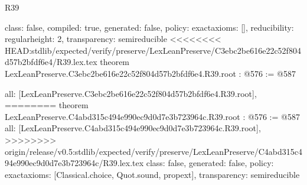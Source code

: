 \begin{lexlean}{R39}
\begin{coremodule}
{{{{{  class: false,
  compiled: true,
  generated: false,
  policy: exact{axioms: []},
  reducibility: regular{height: 2},
  transparency: semireducible
}
<<<<<<<< HEAD:stdlib/expected/verify/preserve/LexLeanPreserve/C3ebc2be616e22c52f804d57b2bfdf6e4/R39.lex.tex
theorem LexLeanPreserve.C3ebc2be616e22c52f804d57b2bfdf6e4.R39.root : @576 := @587 {
  all: [LexLeanPreserve.C3ebc2be616e22c52f804d57b2bfdf6e4.R39.root],
========
theorem LexLeanPreserve.C4abd315c494e990ec9d0d7e3b723964c.R39.root : @576 := @587 {
  all: [LexLeanPreserve.C4abd315c494e990ec9d0d7e3b723964c.R39.root],
>>>>>>>> origin/release/v0.5:stdlib/expected/verify/preserve/LexLeanPreserve/C4abd315c494e990ec9d0d7e3b723964c/R39.lex.tex
  class: false,
  generated: false,
  policy: exact{axioms: [Classical.choice, Quot.sound, propext]},
  transparency: semireducible
}

}}}}}
\end{coremodule}
\end{lexlean}
